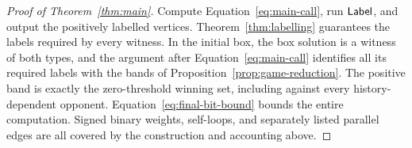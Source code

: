 \begin{proof}[Proof of Theorem~\ref{thm:main}]
Compute Equation~\eqref{eq:main-call}, run $\mathsf{Label}$, and output
the positively labelled vertices. Theorem~\ref{thm:labelling}
guarantees the labels required by every witness. In the initial box,
the box solution is a witness of both types, and the argument after
Equation~\eqref{eq:main-call} identifies all its required labels
with the bands of Proposition~\ref{prop:game-reduction}. The
positive band is exactly the zero-threshold winning set, including
against every history-dependent opponent. Equation~\eqref{eq:final-bit-bound}
bounds the entire computation. Signed binary weights, self-loops,
and separately listed parallel edges are all covered by the
construction and accounting above.
\end{proof}
